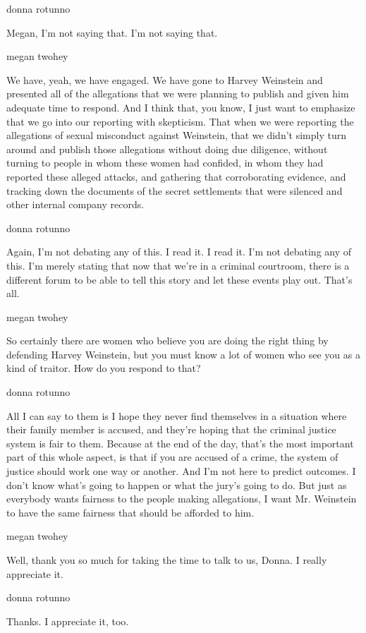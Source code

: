 donna rotunno

Megan, I'm not saying that. I'm not saying that.

megan twohey

We have, yeah, we have engaged. We have gone to Harvey Weinstein and
presented all of the allegations that we were planning to publish and
given him adequate time to respond. And I think that, you know, I just
want to emphasize that we go into our reporting with skepticism. That
when we were reporting the allegations of sexual misconduct against
Weinstein, that we didn't simply turn around and publish those
allegations without doing due diligence, without turning to people in
whom these women had confided, in whom they had reported these alleged
attacks, and gathering that corroborating evidence, and tracking down
the documents of the secret settlements that were silenced and other
internal company records.

donna rotunno

Again, I'm not debating any of this. I read it. I read it. I'm not
debating any of this. I'm merely stating that now that we're in a
criminal courtroom, there is a different forum to be able to tell this
story and let these events play out. That's all.

megan twohey

So certainly there are women who believe you are doing the right thing
by defending Harvey Weinstein, but you must know a lot of women who see
you as a kind of traitor. How do you respond to that?

donna rotunno

All I can say to them is I hope they never find themselves in a
situation where their family member is accused, and they're hoping that
the criminal justice system is fair to them. Because at the end of the
day, that's the most important part of this whole aspect, is that if you
are accused of a crime, the system of justice should work one way or
another. And I'm not here to predict outcomes. I don't know what's going
to happen or what the jury's going to do. But just as everybody wants
fairness to the people making allegations, I want Mr. Weinstein to have
the same fairness that should be afforded to him.

megan twohey

Well, thank you so much for taking the time to talk to us, Donna. I
really appreciate it.

donna rotunno

Thanks. I appreciate it, too.

